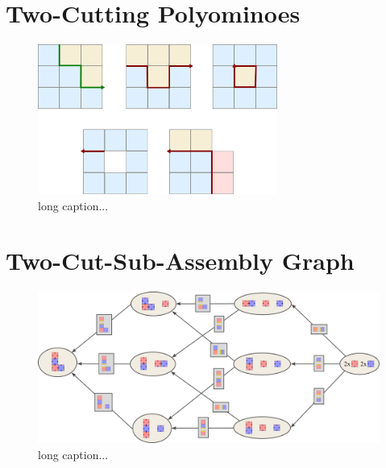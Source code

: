\section{Two-Cutting Polyominoes}
\label{sec:twocutting}

\begin{figure}
	\centering
	\includegraphics[width=0.7\textwidth]{figures/twocuts.pdf}
	\caption[Different two-cuts for polyomino shapes]{long caption...}
	\label{fig:twocuts}
\end{figure}





\section{Two-Cut-Sub-Assembly Graph}
\label{sec:tcsa}

\begin{figure}
	\centering
	\includegraphics[width=1.00\textwidth]{figures/tcsa.pdf}
	\caption[Example for a two-cut-sub-assembly graph.]{long caption...}
	\label{fig:tcsa}
\end{figure}

